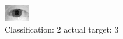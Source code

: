 \begin{figure}[h!]
\begin{center}
\includegraphics[width=0.60\columnwidth]{figures/ID1190_class_2_target_3.png}
\end{center}
\caption{ Classification: 2 actual target: 3}
\label{fig:ID1190_class_2_target_3}
\end{figure}
